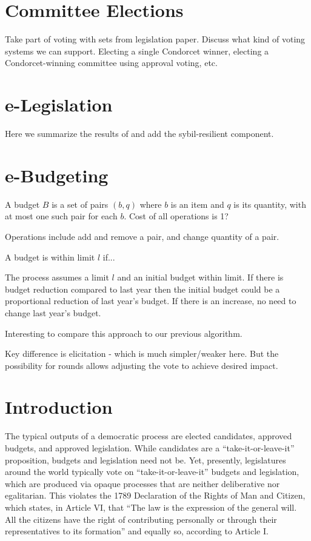 \documentclass{llncs}
\begin{document}
\section{Committee Elections}

Take part of voting with sets from legislation paper.
Discuss what kind of voting systems we can support.
Electing a single Condorcet winner, electing a Condorcet-winning committee using approval voting, etc.

\section{e-Legislation}

Here we summarize the results of \cite{legislation} and add the sybil-resilient component.

\section{e-Budgeting}

A budget $B$ is a set of pairs $(b,q)$ where $b$ is an item and $q$ is its quantity, with at most one such pair for each $b$.
Cost of all operations is 1?

Operations include add and remove a pair, and change quantity of a pair.

A budget is within limit $l$ if...

The process assumes a limit $l$ and an initial budget within limit. If there is budget reduction compared to last year then the initial budget could be a proportional reduction of last year's budget.  If there is an increase, no need to change last year's budget.

Interesting to compare this approach to our previous algorithm.

Key difference is elicitation - which is much simpler/weaker here.
But the possibility for rounds allows adjusting the vote to achieve desired impact.



\pagebreak
\pagebreak


\section{Introduction}\label{section:introduction}


The typical outputs of a democratic process are elected candidates, approved budgets, and approved legislation.  While candidates are a ``take-it-or-leave-it'' proposition, budgets and legislation need not be. Yet, presently, legislatures around the world typically vote on ``take-it-or-leave-it'' budgets and legislation, which are produced via opaque processes that are neither deliberative nor egalitarian.  This violates the 1789 Declaration of the Rights of Man and Citizen, which states, in Article VI, that ``The law is the expression of the general will. All the citizens have the right of contributing personally or through their representatives to its formation'' and equally so, according to Article I.
\end{document}
